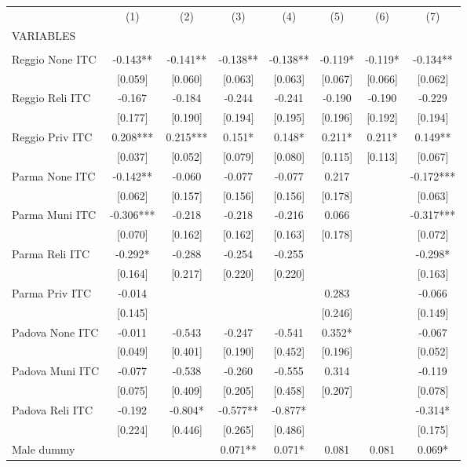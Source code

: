 \begin{tabular}{lccccccc} \hline
 & (1) & (2) & (3) & (4) & (5) & (6) & (7) \\
VARIABLES &  &  &  &  &  &  &  \\ \hline
 &  &  &  &  &  &  &  \\
Reggio None ITC & -0.143** & -0.141** & -0.138** & -0.138** & -0.119* & -0.119* & -0.134** \\
 & [0.059] & [0.060] & [0.063] & [0.063] & [0.067] & [0.066] & [0.062] \\
Reggio Reli ITC & -0.167 & -0.184 & -0.244 & -0.241 & -0.190 & -0.190 & -0.229 \\
 & [0.177] & [0.190] & [0.194] & [0.195] & [0.196] & [0.192] & [0.194] \\
Reggio Priv ITC & 0.208*** & 0.215*** & 0.151* & 0.148* & 0.211* & 0.211* & 0.149** \\
 & [0.037] & [0.052] & [0.079] & [0.080] & [0.115] & [0.113] & [0.067] \\
Parma None ITC & -0.142** & -0.060 & -0.077 & -0.077 & 0.217 &  & -0.172*** \\
 & [0.062] & [0.157] & [0.156] & [0.156] & [0.178] &  & [0.063] \\
Parma Muni ITC & -0.306*** & -0.218 & -0.218 & -0.216 & 0.066 &  & -0.317*** \\
 & [0.070] & [0.162] & [0.162] & [0.163] & [0.178] &  & [0.072] \\
Parma Reli ITC & -0.292* & -0.288 & -0.254 & -0.255 &  &  & -0.298* \\
 & [0.164] & [0.217] & [0.220] & [0.220] &  &  & [0.163] \\
Parma Priv ITC & -0.014 &  &  &  & 0.283 &  & -0.066 \\
 & [0.145] &  &  &  & [0.246] &  & [0.149] \\
Padova None ITC & -0.011 & -0.543 & -0.247 & -0.541 & 0.352* &  & -0.067 \\
 & [0.049] & [0.401] & [0.190] & [0.452] & [0.196] &  & [0.052] \\
Padova Muni ITC & -0.077 & -0.538 & -0.260 & -0.555 & 0.314 &  & -0.119 \\
 & [0.075] & [0.409] & [0.205] & [0.458] & [0.207] &  & [0.078] \\
Padova Reli ITC & -0.192 & -0.804* & -0.577** & -0.877* &  &  & -0.314* \\
 & [0.224] & [0.446] & [0.265] & [0.486] &  &  & [0.175] \\
Male dummy &  &  & 0.071** & 0.071* & 0.081 & 0.081 & 0.069* \\

\end{tabular}
